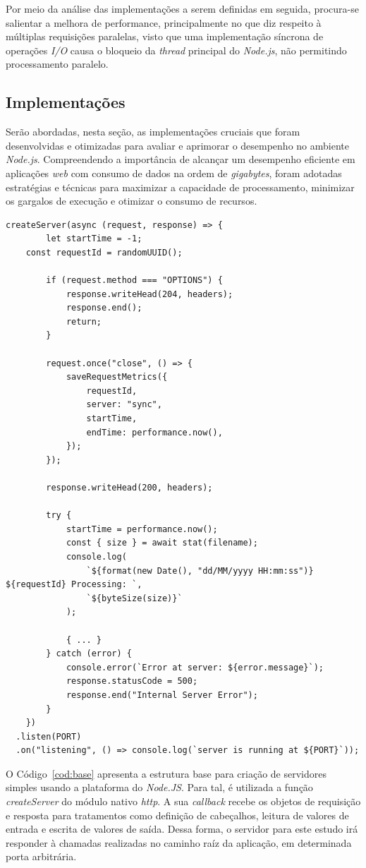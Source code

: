 \documentclass[12pt]{article}
\begin{document}
Por meio da análise das implementações a serem definidas em seguida, procura-se salientar a melhora de performance,
principalmente no que diz respeito à múltiplas requisições paralelas, visto que uma implementação síncrona de operações
\textit{I/O} causa o bloqueio da \textit{thread} principal do \textit{Node.js}, não permitindo processamento paralelo.


\subsection{Implementações}

Serão abordadas, nesta seção, as implementações cruciais que foram desenvolvidas e 
otimizadas para avaliar e aprimorar o desempenho no ambiente \textit{Node.js}. Compreendendo a 
importância de alcançar um desempenho eficiente em aplicações \textit{web} com consumo de dados na ordem
de \textit{gigabytes}, foram adotadas estratégias e técnicas para maximizar a capacidade de 
processamento, minimizar os gargalos de execução e otimizar o consumo de recursos. 

\begin{lstlisting}[caption={Código base para um servidor \textit{Node.JS}}, label=cod:base]
	createServer(async (request, response) => {
		let startTime = -1;
  	const requestId = randomUUID();

		if (request.method === "OPTIONS") {
			response.writeHead(204, headers);
			response.end();
			return;
		}

		request.once("close", () => {
			saveRequestMetrics({
				requestId,
				server: "sync",
				startTime,
				endTime: performance.now(),
			});
		});

		response.writeHead(200, headers);

		try {
			startTime = performance.now();
			const { size } = await stat(filename);
			console.log(
				`${format(new Date(), "dd/MM/yyyy HH:mm:ss")} ${requestId} Processing: `,
				`${byteSize(size)}`
			);

			{ ... }
		} catch (error) {
			console.error(`Error at server: ${error.message}`);
			response.statusCode = 500;
			response.end("Internal Server Error");
		}
	})
  .listen(PORT)
  .on("listening", () => console.log(`server is running at ${PORT}`));
\end{lstlisting}

O Código~\ref{cod:base} apresenta a estrutura base para criação de servidores simples usando a 
plataforma do \textit{Node.JS}. Para tal, é utilizada a função \textit{createServer} do módulo nativo \textit{http}.
A sua \textit{callback} recebe os objetos de requisição e resposta para tratamentos como definição de cabeçalhos, leitura
de valores de entrada e escrita de valores de saída. Dessa forma, o servidor para este estudo irá responder à chamadas
realizadas no caminho raíz da aplicação, em determinada porta arbitrária.
\end{document}

